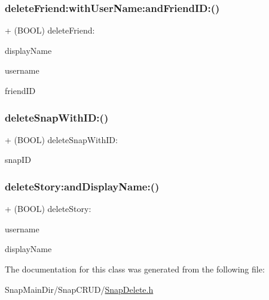 \hypertarget{interface_snap_delete_aeff47c1ac973a925794c4a8ba9752b67}{}\label{interface_snap_delete_aeff47c1ac973a925794c4a8ba9752b67} 
\subsubsection{\texorpdfstring{delete\+Friend\+:with\+User\+Name\+:and\+Friend\+I\+D\+:()}{deleteFriend:withUserName:andFriendID:()}}
{\footnotesize\ttfamily + (B\+O\+OL) delete\+Friend\+: \begin{DoxyParamCaption}\item[{(N\+S\+String $\ast$)}]{display\+Name }\item[{withUserName:(N\+S\+String $\ast$)}]{username }\item[{andFriendID:(N\+S\+String $\ast$)}]{friend\+ID }\end{DoxyParamCaption}}

\hypertarget{interface_snap_delete_ab162fbe8f22b3cc98556083382196901}{}\label{interface_snap_delete_ab162fbe8f22b3cc98556083382196901} 
\subsubsection{\texorpdfstring{delete\+Snap\+With\+I\+D\+:()}{deleteSnapWithID:()}}
{\footnotesize\ttfamily + (B\+O\+OL) delete\+Snap\+With\+I\+D\+: \begin{DoxyParamCaption}\item[{(N\+S\+String $\ast$)}]{snap\+ID }\end{DoxyParamCaption}}

\hypertarget{interface_snap_delete_a51fc8d13f55334e8b1d7e8eb14b32932}{}\label{interface_snap_delete_a51fc8d13f55334e8b1d7e8eb14b32932} 
\subsubsection{\texorpdfstring{delete\+Story\+:and\+Display\+Name\+:()}{deleteStory:andDisplayName:()}}
{\footnotesize\ttfamily + (B\+O\+OL) delete\+Story\+: \begin{DoxyParamCaption}\item[{(N\+S\+String $\ast$)}]{username }\item[{andDisplayName:(N\+S\+String $\ast$)}]{display\+Name }\end{DoxyParamCaption}}



The documentation for this class was generated from the following file\+:\begin{DoxyCompactItemize}
\item 
Snap\+Main\+Dir/\+Snap\+C\+R\+U\+D/\hyperlink{_snap_delete_8h}{Snap\+Delete.\+h}\end{DoxyCompactItemize}
